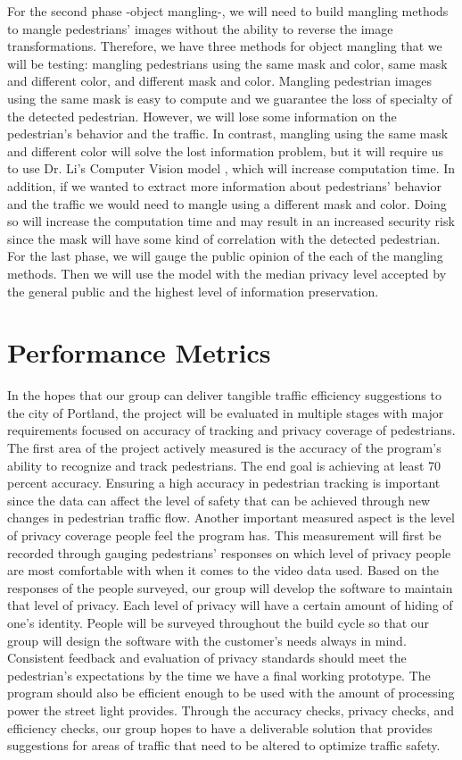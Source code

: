 \documentclass[onecolumn, draftclsnofoot,10pt, compsoc]{IEEEtran}
\begin{document}
For the second phase -object mangling-, we will need to build mangling methods to mangle pedestrians' images without the ability to reverse the image transformations. Therefore, we have three methods for object mangling that we will be testing: mangling pedestrians using the same mask and color, same mask and different color, and different mask and color. Mangling pedestrian images using the same mask is easy to compute and we guarantee the loss of specialty of the detected pedestrian. However, we will lose some information on the pedestrian's behavior and the traffic. In contrast, mangling using the same mask and different color will solve the lost information problem, but it will require us to use Dr. Li's Computer Vision model \cite{li-model}, which will increase computation time. In addition, if we wanted to extract more information about pedestrians' behavior and the traffic we would need to mangle using a different mask and color. Doing so will increase the computation time and may result in an increased security risk since the mask will have some kind of correlation with the detected pedestrian. For the last phase, we will gauge the public opinion of the each of the mangling methods. Then we will use the model with the median privacy level accepted by the general public and the highest level of information preservation.

\section{Performance Metrics}
In the hopes that our group can deliver tangible traffic efficiency suggestions to the city of Portland, the project will be evaluated in multiple stages with major requirements focused on accuracy of tracking and privacy coverage of pedestrians. The first area of the project actively measured is the accuracy of the program's ability to recognize and track pedestrians. The end goal is achieving at least 70 percent accuracy. Ensuring a high accuracy in pedestrian tracking is important since the data can affect the level of safety that can be achieved through new changes in pedestrian traffic flow. Another important measured aspect is the level of privacy coverage people feel the program has. This measurement will first be recorded through gauging pedestrians' responses on which level of privacy people are most comfortable with when it comes to the video data used. Based on the responses of the people surveyed, our group will develop the software to maintain that level of privacy. Each level of privacy will have a certain amount of hiding of one’s identity. People will be surveyed throughout the build cycle so that our group will design the software with the customer’s needs always in mind. Consistent feedback and evaluation of privacy standards should meet the pedestrian's expectations by the time we have a final working prototype. The program should also be efficient enough to be used with the amount of processing power the street light provides. Through the accuracy checks, privacy checks, and efficiency checks, our group hopes to have a deliverable solution that provides suggestions for areas of traffic that need to be altered to optimize traffic safety.

  
  
\end{document}
